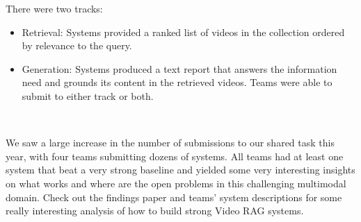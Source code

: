 There were two tracks:

\begin{itemize}
    \item Retrieval: Systems provided a ranked list of videos in the collection ordered by relevance to the query.
    \item Generation: Systems produced a text report that answers the information need and grounds its content in the retrieved videos.
Teams were able to submit to either track or both.
\end{itemize}

$ $\par

We saw a large increase in the number of submissions to our shared task this year, with four teams submitting dozens of systems. All teams had at least one system that beat a very strong baseline and yielded some very interesting insights on what works and where are the open problems in this challenging multimodal domain. Check out the findings paper and teams' system descriptions for some really interesting analysis of how to build strong Video RAG systems.

%
%
%
%
%
%
%
%

